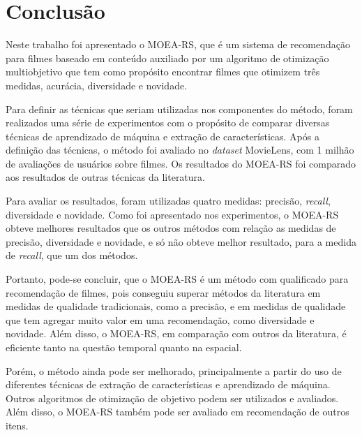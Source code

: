 \chapter{Conclusão}

Neste trabalho foi apresentado o  MOEA-RS, que é um sistema de recomendação para filmes baseado em conteúdo auxiliado por um algoritmo de otimização multiobjetivo que tem como propósito encontrar filmes que otimizem  três medidas, acurácia, diversidade e novidade.

Para definir as técnicas que seriam utilizadas nos componentes do método, foram realizados uma série de experimentos com o propósito de comparar diversas técnicas de aprendizado de máquina e extração de características. Após a definição das técnicas, o método foi avaliado no \textit{dataset} MovieLens, com 1 milhão de avaliações de usuários sobre filmes. Os resultados do MOEA-RS foi comparado aos resultados de outras técnicas da literatura.

Para avaliar os resultados, foram utilizadas quatro medidas: precisão, \textit{recall}, diversidade e novidade. Como foi apresentado nos experimentos, o MOEA-RS obteve melhores resultados que os outros métodos com relação as  medidas de precisão, diversidade e novidade, e só não obteve melhor resultado, para a medida de \textit{recall}, que um dos métodos.

Portanto, pode-se concluir, que o MOEA-RS é um método com qualificado para recomendação de filmes, pois conseguiu superar métodos da literatura em medidas de qualidade tradicionais, como a precisão, e em medidas de qualidade que tem agregar muito valor em uma recomendação, como diversidade e novidade. Além disso, o MOEA-RS, em comparação com outros da literatura, é eficiente tanto na questão temporal quanto na espacial.

Porém, o método ainda pode ser melhorado, principalmente  a partir do uso de diferentes técnicas de extração de características e aprendizado de máquina. Outros algoritmos de otimização de objetivo podem ser utilizados e avaliados. Além disso, o MOEA-RS também pode ser avaliado em recomendação de outros itens.


